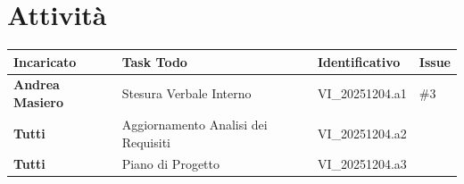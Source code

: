 \documentclass[a4paper,12pt]{article}
\begin{document}
    \section{Attività} {
        \begin{tabularx}{\textwidth}{|l|X|l|l|}
            \hline
            \textbf{Incaricato} & \textbf{Task Todo} & \textbf{Identificativo} & \textbf{Issue} \\
            \hline
            \textbf{Andrea Masiero} & Stesura Verbale Interno & VI\_20251204.a1 & \#3\\
            \hline
            \textbf{Tutti} & Aggiornamento Analisi dei Requisiti & VI\_20251204.a2 & \\
            \hline
            \textbf{Tutti} & Piano di Progetto & VI\_20251204.a3 & \\
            \hline
            \end{tabularx}
    }
\end{document}
